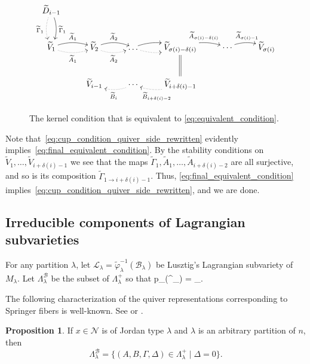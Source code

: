 \documentclass[11pt,reqno]{amsart}
\numberwithin{equation}{section}
\theoremstyle{definition}
\newtheorem{prop}[theorem]{Proposition}
\newcommand{\cB}{\mathcal{B}}
\newcommand{\cL}{\mathcal{L}}
\newcommand{\cN}{\mathcal{N}}
\newcommand{\inv}{^{-1}}
\newcommand{\ld}{\lambda}
\newcommand{\tA}{\widetilde{A}}
\newcommand{\tB}{\widetilde{B}}
\newcommand{\tD}{\widetilde{D}}
\newcommand{\tGa}{\widetilde{\Gamma}}
\newcommand{\tphi}{\widetilde{\varphi}}
\newcommand{\tV}{\widetilde{V}}
\begin{document}
\begin{figure}[ht!]
\caption{The kernel condition that is equivalent to \eqref{eq:equivalent_condition}.}
\label{fig:cupeq}
\[ 
\xymatrix@C=25pt@R=25pt{
{\tD_{i-1}}  
	\ar@/^/[d]^{\tGa_1}
	\ar@/_/@{.>}[d]_{\tGa_1}
\\
{\tV_{1}}
	\ar@/^/[r]^{\tA_{1}}
	\ar@/_/@{.>}[r]_{\tA_{1}}  
&
{\tV_{2}}
	\ar@/^/[r]^{\tA_{2}}
	\ar@/_/@{.>}[r]_{\tA_{2}}  
&
\dots  
	\ar@/^/[r]
	\ar@/_/@{.>}[r]  
	&
	\ar@{=}[d]
{\tV_{\sigma(i)-\delta(i)}}  
	\ar@/^/[r]^{\tA_{\sigma(i)-\delta(i)}}
	& 
	\cdots
   \ar@/^/[r]^{\tA_{\sigma(i)-1}}
	& 
{\tV_{\sigma(i)}} 
\\
&
{\tV_{i-1}}  
	&
	\ar@/^/@{.>}[l]^{\tB_{i}}   
	\cdots
	&
	\ar@/^/@{.>}[l]^{\tB_{i+\delta(i)-2}}
{\tV_{i+\delta(i)-1}}  
	& 
	& 
}
\] 
\end{figure}

Note that~\eqref{eq:cup_condition_quiver_side_rewritten} evidently implies~\eqref{eq:final_equivalent_condition}. 
By the stability conditions on $\tV_1, \ldots, \tV_{i+\delta(i) -1}$ we see that the maps $\tGa_1, \tA_1, \ldots, \tA_{i+\delta(i)-2}$ are all surjective, and so is its composition $\tGa_{1\to i+\delta(i)-1}$. 
Thus, \eqref{eq:final_equivalent_condition} implies~\eqref{eq:cup_condition_quiver_side_rewritten}, and we are done.
\endproof

\subsection{Irreducible components of Lagrangian subvarieties} \label{sec:IrrLagr}
For any partition $\ld$, let $\cL_\ld = \tphi\inv_\ld(\cB_{\ld})$ be Lusztig's Lagrangian subvariety of $M_\ld$.
Let $\Lambda^\cB_{\ld}$ be the subset of $\Lambda^+_{\ld}$ so that
\eq
p_{\ld}(\Lambda^\cB_{\ld}) = \cL_\ld.
\endeq

The following characterization of the quiver representations corresponding to Springer fibers is well-known. See \cite[Lemma~5.9]{Na94} or \cite[Lemma~2.22]{Lu98}.

\begin{prop}\label{prop:Spr}
If $x\in \cN$ is of Jordan type $\ld$ and $\lambda$ is an arbitrary partition of $n$, then
\[
\Lambda^\cB_{\ld} = \{(A,B,\Gamma,\Delta) \in \Lambda^+_{\ld}\mid\Delta = 0 \}.
\]
\end{prop}
\end{document}
